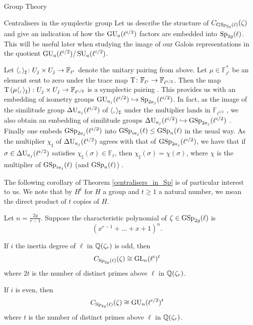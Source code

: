 \documentclass[11pt,a4paper]{article}
\newcommand{\Fl}{\mathbb{F}_\ell}
\newcommand{\Fli}{\mathbb{F}_{\ell^i}}
\newcommand{\Flihalf}{\mathbb{F}_{\ell^{i/2}}}
\newcommand{\lihalf}{{\ell^{i/2}}}
\newcommand{\rcyclo}{\QQ(\zeta_r)}
\begin{document}
\begin{section}{Group Theory}
\begin{subsection}{Centralisers in the symplectic group}
Let us describe the structure of $C_{\GSp_{2g}(\ell)}(\zeta)$ and give an indication of how the $\GU_a(\ell^{i/2})$ factors are embedded into $\Sp_{2g}(\ell)$. This will be useful later when studying the image of our Galois representations in the quotient $\GU_a(\ell^{i/2})/\SU_a(\ell^{i/2})$. 

Let $\lr_{\sharp}\colon U_j \times U_j \rightarrow \Fli$ denote the unitary pairing from above.
Let $\mu \in \Fli^*$ be an element sent to zero under the trace map ${\mathrm T}\colon\Fli \rightarrow \FF_{\ell^{i/2}}$. Then the map ${\mathrm T}\left(\mu \langle, \rangle_{\sharp}\right)\colon U_j \times U_j \rightarrow \mathbb{F}_{\ell^{i/2}}$ is a symplectic pairing \cite[Pg.117 - 118]{KleidmanLiebeck}.
This provides us with an embedding of isometry groups $\GU_{a_j}(\ell^{i/2}) \hookrightarrow \Sp_{2a_j}(\ell^{i/2})$.
In fact, as the image of the similitude group $\DU_{a_j}(\ell^{i/2})$ of $\langle, \rangle_{\sharp}$  under the multiplier lands in $\Flihalf$ \cite[Pg.23]{KleidmanLiebeck}, we also obtain an embedding of similitude groups $\DU_{a_j}(\ell^{i/2}) \hookrightarrow \GSp_{2a_j}(\ell^{i/2})$ \cite[Pg.118]{KleidmanLiebeck}.
Finally one embeds $\GSp_{2a_j}(\lihalf)$ into $\GSp_{ia_j}(\ell) \leq \GSp_{n}(\ell)$ in the usual way. As the multiplier $\chi_\sharp$ of $\DU_{a_j}(\ell^{i/2})$ agrees with that of $ \GSp_{2a_j}(\ell^{i/2})$, we have that if $\sigma \in \DU_{a_j}(\ell^{i/2})$ satisfies $\chi_\sharp(\sigma) \in \Fl$, then $\chi_\sharp(\sigma) =\chi(\sigma)$, where $\chi$ is the multiplier of $\GSp_{ia_j}(\ell)$ (and $\GSp_{n}(\ell)$) \cite[Lemma 4.3.5]{KleidmanLiebeck}.



 
 The following corollary of Theorem \ref{centralisers_in_Sp} is of particular interest to us.
We note that by $H^t$ for $H$ a group and $t \geq 1$ a natural number, we mean the direct product of $t$ copies of $H$.
 
\begin{corollary}
\label{cor_centraliser_structure_of_zr}
Let $n = \frac{2g}{r-1}$. Suppose the characteristic polynomial of $\zeta \in \GSp_{2g}(\ell)$ is $$(x^{r-1} + \ldots + x +
1 )^n.$$

If $i$ the inertia degree of $\ell$ in $\rcyclo$ is odd, then 
$$ C_{\Sp_{2g}(\ell)}(\zeta) \cong \GL_{n}(\ell^i)^{t}$$
where  $2t$ is the number of distinct primes above $\ell$ in $\rcyclo$.

If $i$ is even, then 
$$ C_{\Sp_{2g}(\ell)}(\zeta) \cong \GU_{n}(\ell^{i/2})^t$$
where $t$ is the number of distinct primes above $\ell$ in $\rcyclo$.
\end{corollary}


\end{subsection}
\end{section}
\end{document}
